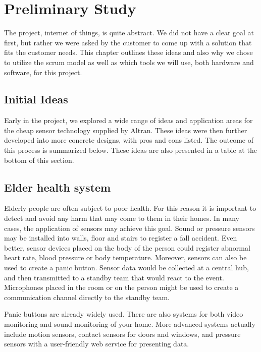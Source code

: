 \documentclass[../document.tex]{subfiles}
\begin{document}
\section*{Preliminary Study}
The project, internet of things, is quite abstract. We did not have a clear goal at first, but rather we were asked by the customer to come up with a solution that fits the customer needs. This chapter outlines these ideas and also why we chose to utilize the scrum model as well as which tools we will use, both hardware and software, for this project.

\subsection*{Initial Ideas}
Early in the project, we explored a wide range of ideas and application areas for the cheap sensor technology supplied by Altran. These ideas were then further developed into more concrete designs, with pros and cons listed. The outcome of this process is summarized below. These ideas are also presented in a table at the bottom of this section.

\subsection*{Elder health system}
Elderly people are often subject to poor health. For this reason it is important to detect and avoid any harm that may come to them in their homes. In many cases, the application of sensors may achieve this goal. Sound or pressure sensors may be installed into walls, floor and stairs to register a fall accident. Even better, sensor devices placed on the body of the person could register abnormal heart rate, blood pressure or body temperature. Moreover, sensors can also be used to create a panic button. Sensor data would be collected at a central hub, and then transmitted to a standby team that would react to the event. Microphones placed in the room or on the person might be used to create a communication channel directly to the standby team.

Panic buttons are already widely used. There are also systems for both video monitoring and sound monitoring of your home. More advanced systems actually include motion sensors, contact sensors for doors and windows, and pressure sensors with a user-friendly web service for presenting data.
\end{document}
